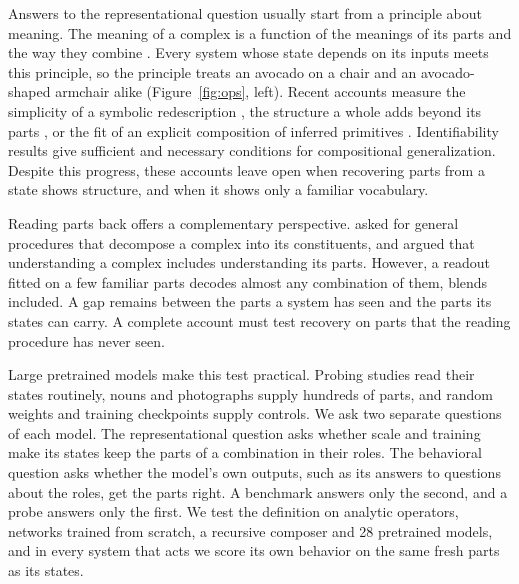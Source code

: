 \documentclass[10pt]{article}
\theoremstyle{plain}
\theoremstyle{remark}
\begin{document}
Answers to the representational question usually start from a principle about meaning. The meaning of a complex is a function of the meanings of its parts and the way they combine \citep{montague1970}. Every system whose state depends on its inputs meets this principle, so the principle treats an avocado on a chair and an avocado-shaped armchair alike (Figure~\ref{fig:ops}, left). Recent accounts measure the simplicity of a symbolic redescription \citep{elmoznino2024}, the structure a whole adds beyond its parts \citep{elmoznino2026}, or the fit of an explicit composition of inferred primitives \citep{andreas2019}. Identifiability results give sufficient \citep{lachapelle2023,wiedemer2024} and necessary \citep{uselis2026} conditions for compositional generalization. Despite this progress, these accounts leave open when recovering parts from a state shows structure, and when it shows only a familiar vocabulary.

Reading parts back offers a complementary perspective. \citet{vangelder1990} asked for general procedures that decompose a complex into its constituents, and \citet{fodor2002} argued that understanding a complex includes understanding its parts. However, a readout fitted on a few familiar parts decodes almost any combination of them, blends included. A gap remains between the parts a system has seen and the parts its states can carry. A complete account must test recovery on parts that the reading procedure has never seen.

Large pretrained models make this test practical. Probing studies read their states routinely, nouns and photographs supply hundreds of parts, and random weights and training checkpoints supply controls. We ask two separate questions of each model. The representational question asks whether scale and training make its states keep the parts of a combination in their roles. The behavioral question asks whether the model's own outputs, such as its answers to questions about the roles, get the parts right. A benchmark answers only the second, and a probe answers only the first. We test the definition on analytic operators, networks trained from scratch, a recursive composer and 28 pretrained models, and in every system that acts we score its own behavior on the same fresh parts as its states.
\end{document}

